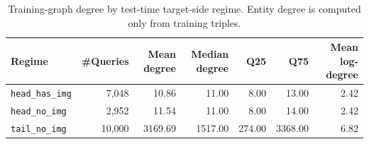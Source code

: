 \begin{table}[H]
\centering
\small
\caption{Training-graph degree by test-time target-side regime. Entity degree is computed only from training triples.}
\label{tab:degree_by_target_regime}
\begin{tabular}{lrrrrrr}
\toprule
Regime & \#Queries & Mean degree & Median degree & Q25 & Q75 & Mean log-degree \\
\midrule
\texttt{head\_has\_img} & 7,048 & 10.86 & 11.00 & 8.00 & 13.00 & 2.42 \\
\texttt{head\_no\_img} & 2,952 & 11.54 & 11.00 & 8.00 & 14.00 & 2.42 \\
\texttt{tail\_no\_img} & 10,000 & 3169.69 & 1517.00 & 274.00 & 3368.00 & 6.82 \\
\bottomrule
\end{tabular}
\end{table}
